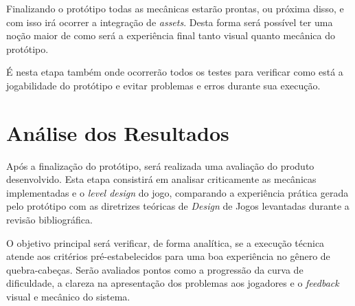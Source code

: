 Finalizando o protótipo todas as mecânicas estarão prontas, ou próxima disso, e com isso irá ocorrer a integração de \textit{assets}. Desta forma será possível ter uma noção maior de como será a experiência final tanto visual quanto mecânica do protótipo.

É nesta etapa também onde ocorrerão todos os testes para verificar como está a jogabilidade do protótipo e evitar problemas e erros durante sua execução.

\section{Análise dos Resultados}

Após a finalização do protótipo, será realizada uma avaliação do produto desenvolvido. Esta etapa consistirá em analisar criticamente as mecânicas implementadas e o \textit{level design} do jogo, comparando a experiência prática gerada pelo protótipo com as diretrizes teóricas de \textit{Design} de Jogos levantadas durante a revisão bibliográfica.

O objetivo principal será verificar, de forma analítica, se a execução técnica atende aos critérios pré-estabelecidos para uma boa experiência no gênero de quebra-cabeças. Serão avaliados pontos como a progressão da curva de dificuldade, a clareza na apresentação dos problemas aos jogadores e o \textit{feedback} visual e mecânico do sistema.